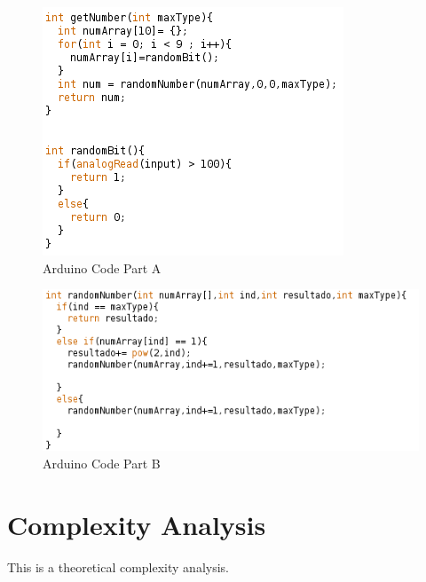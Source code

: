 \documentclass[twocolumn]{IEEEtran}
\begin{document}
\begin{enumerate}
    \begin{figure}[h!]
        \centering
        \includegraphics[width=\columnwidth]{src/ArduinoCode1.png}
		\caption{Arduino Code Part A}
        \label{fig:crossover}
		\end{figure}
        
        \begin{figure}[h!]
        \centering
        \includegraphics[width=\columnwidth]{src/ArduinoCode2.png}
		\caption{Arduino Code Part B}
        \label{fig:crossover}
		\end{figure}
        
\end{enumerate}



\section{Complexity Analysis}
This is a theoretical complexity analysis.
\end{document}
